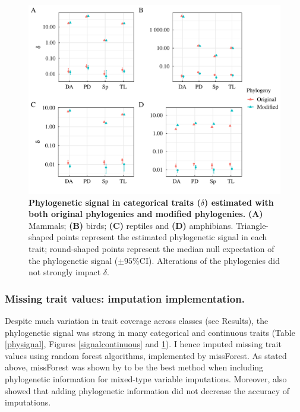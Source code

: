 \begin{figure}[h!]
\centering
\includegraphics[scale=0.65]{figures/chapter2/Phylosignal/Categorical}
\caption[Phylogenetic signal in categorical traits ($\delta$) estimated with both original phylogenies and modified phylogenies]{\textbf{Phylogenetic signal in categorical traits ($\delta$) estimated with both original phylogenies and modified phylogenies.} \textbf{(A)} Mammals; \textbf{(B)} birds; \textbf{(C)} reptiles and \textbf{(D)} amphibians. Triangle-shaped points represent the estimated phylogenetic signal in each trait; round-shaped points represent the median null expectation of the phylogenetic signal ($\pm95\%$CI). Alterations of the phylogenies did not strongly impact $\delta$.}
\label{signalcategorical}
\end{figure}

\pagebreak


\subsubsection{Missing trait values: imputation implementation.}
Despite much variation in trait coverage across classes (see Results), the phylogenetic signal was strong in many categorical and continuous traits (Table \ref{physignal}, Figures \ref{signalcontinuous} and \ref{signalcategorical}). 
I hence imputed missing trait values using random forest algorithms, implemented by missForest. As stated above, missForest was shown by \citet{Penone2014} to be the best method when including phylogenetic information for mixed-type variable imputations. Moreover, \citet{Penone2014} also showed that adding phylogenetic information did not decrease the accuracy of imputations. 

